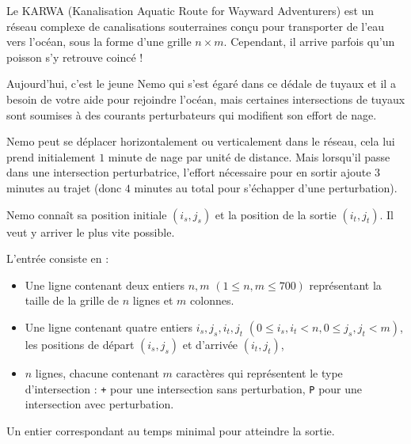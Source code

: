 \problemname{\problemyamlname{}}


Le KARWA (Kanalisation Aquatic Route for Wayward Adventurers) est un réseau complexe de canalisations souterraines conçu pour transporter de l'eau vers l'océan, sous la forme d'une grille $n \times m$. Cependant, il arrive parfois qu'un poisson s'y retrouve coincé !

Aujourd'hui, c'est le jeune Nemo qui s'est égaré dans ce dédale de tuyaux et il a besoin de votre aide pour rejoindre l'océan, mais certaines intersections de tuyaux sont soumises à des courants perturbateurs qui modifient son effort de nage.

Nemo peut se déplacer horizontalement ou verticalement dans le réseau, cela lui prend initialement $1$ minute de nage par unité de distance. Mais lorsqu'il passe dans une intersection perturbatrice, l'effort nécessaire pour en sortir ajoute $3$ minutes au trajet (donc $4$ minutes au total pour s'échapper d'une perturbation).

Nemo connaît sa position initiale $(i_s, j_s)$ et la position de la sortie $(i_t, j_t)$. Il veut y arriver le plus vite possible.

\begin{Input}
    L'entrée consiste en :
    \begin{itemize}
        \item Une ligne contenant deux entiers $n, m$ $(1 \leq n, m \leq 700)$ représentant la taille de la grille de $n$ lignes et $m$ colonnes.
        \item Une ligne contenant quatre entiers $i_s, j_s, i_t, j_t$ $(0 \leq i_s, i_t < n, 0 \leq j_s, j_t < m)$, les positions de départ $(i_s,j_s)$ et d'arrivée $(i_t,j_t)$,
        \item $n$ lignes, chacune contenant $m$ caractères qui représentent le type d'intersection : \texttt{+} pour une intersection sans perturbation, \texttt{P} pour une intersection avec perturbation.
    \end{itemize}
\end{Input}

\begin{Output}
    Un entier correspondant au temps minimal pour atteindre la sortie.
\end{Output}